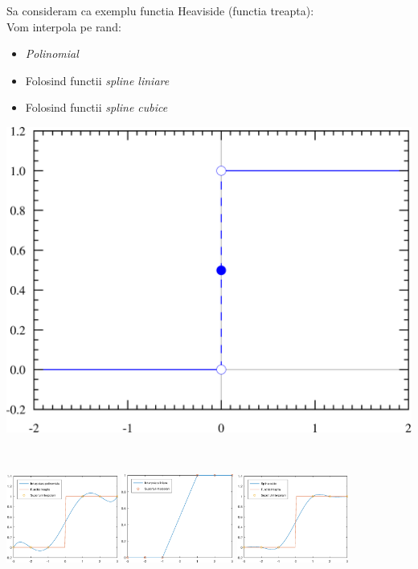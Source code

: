 \documentclass{article}
\begin{document}
\begin{minipage}{0.65\textwidth}
    Sa consideram ca exemplu functia Heaviside (functia treapta):\\
    Vom interpola pe rand:
    \begin{itemize}
        \item \textit{Polinomial}
        \item Folosind functii \textit{spline liniare}
        \item Folosind functii \textit{spline cubice}
    \end{itemize}
\end{minipage}
\begin{minipage}{0.35\textwidth}
    \includegraphics[scale=0.115]{heaviside_fct}
\end{minipage}\\

\begin{center}
    \includegraphics[width=0.275\textwidth]{heaviside_pol}
    \includegraphics[width=0.275\textwidth]{heaviside_lin}
    \includegraphics[width=0.275\textwidth]{heaviside_cub}
\end{center}
\end{document}
